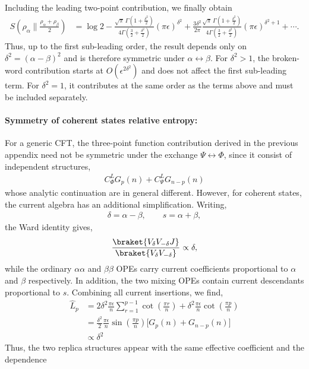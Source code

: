 \documentclass[11pt]{article}
\newcommand{\ep}{\epsilon}
\newcommand{\nn}{\nonumber}
\newcommand{\lb}{\left(}
\newcommand{\rb}{\right)}
\begin{document}
Including the leading two-point contribution, we finally obtain
\begin{align}
    S\lb
    \rho_\alpha
    \Big\|
    \frac{\rho_\alpha+\rho_\beta}{2}
    \rb
    &=
    \log 2
    -
    \frac{
    \sqrt{\pi}\,
    \Gamma\lb1+\frac{\delta^2}{2}\rb
    }{
    4\Gamma\lb\frac32+\frac{\delta^2}{2}\rb
    }
    (\pi\ep)^{\delta^2}+
    \frac{3\delta^2}{2\pi}
    \frac{
    \sqrt{\pi}\,
    \Gamma\lb1+\frac{\delta^2}{2}\rb
    }{
    4\Gamma\lb\frac32+\frac{\delta^2}{2}\rb
    }
    (\pi\ep)^{\delta^2+1}
    +\cdots .
\end{align}
Thus, up to the first sub-leading order, the result depends only on
$\delta^2=(\alpha-\beta)^2$ and is therefore symmetric under
$\alpha\leftrightarrow\beta$. For $\delta^2>1$, the broken-word contribution starts at
$O(\ep^{2\delta^2})$ and does not affect the first sub-leading term. For
$\delta^2=1$, it contributes at the same order as the terms above and must be included separately.
\paragraph{Symmetry of coherent states relative entropy:}
For a generic CFT, the three-point function contribution derived in the previous appendix need not be symmetric under the exchange $\Psi \leftrightarrow\Phi$, since it consist of independent structures,
\begin{align}
    C_\Phi^L G_p(n) + C_\Psi^LG_{n-p}(n)
\end{align}
whose analytic continuation are in general different. However, for coherent states, the current algebra has an additional simplification. Writing, 
\begin{align}
    \delta = \alpha - \beta, \qquad s = \alpha + \beta,
\end{align}
the Ward identity gives, 
\begin{align}
    \frac{\braket{V_\delta V_{-\delta}J}}{\braket{V_\delta V_{-\delta}}}\propto \delta,
\end{align}
while the ordinary $\alpha \alpha$ and $\beta\beta$ OPEs carry current coefficients proportional to $\alpha$ and $\beta$ respectively. In addition, the two mixing OPEs contain current descendants proportional to $s$. Combining all current insertions, we find,
\begin{align}
    \hat L_p &= 
    2\delta^2\frac{\pi\ep}{n}
    \sum_{r=1}^{p-1}\cot\lb\frac{\pi r}{n}\rb
    +
    \delta^2\frac{\pi\ep}{n}
    \cot\lb\frac{\pi p}{n}\rb
    \nn\\
    &=
    \frac{\delta^2}{2}
    \frac{\pi\ep}{n}
    \sin\lb\frac{\pi p}{n}\rb
    \Big[
    G_p(n)+G_{n-p}(n)
    \Big] \\
    &\propto \delta^2
\end{align}
Thus, the two replica structures appear with the same effective coefficient and the dependence 
\end{document}
